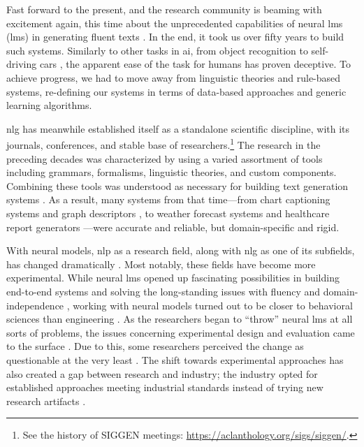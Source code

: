 Fast forward to the present, and the research community is beaming with excitement again, this time about the unprecedented capabilities of neural \aclp{lm} (\acsp{lm}) in generating fluent texts \cite{radford2019language,brown2020language}. In the end, it took us over fifty years to build such systems. Similarly to other tasks in \ac{ai}, from object recognition \cite{papert1966summer} to self-driving cars \cite{autonomouscars}, the apparent ease of the task for humans has proven deceptive.  To achieve progress, we had to move away from linguistic theories and rule-based systems, re-defining our systems in terms of data-based approaches and generic learning algorithms.

\Ac{nlg} has meanwhile established itself as a standalone scientific discipline, with its journals, conferences, and stable base of researchers.\footnote{See the history of SIGGEN meetings: \url{https://aclanthology.org/sigs/siggen/}.} The research in the preceding decades was characterized by using a varied assortment of tools including grammars, formalisms, linguistic theories, and custom components. Combining these tools was understood as necessary for building text generation systems \cite{mann-1982-text,reiterBuildingAppliedNatural1997}. As a result, many systems from that time---from chart captioning systems \cite{mittalDescribingComplexCharts1998} and graph descriptors \cite{sunDomainIndependentSentence2006}, to weather forecast systems \cite{belzAutomaticGenerationWeather2008} and healthcare report generators \cite{portetAutomaticGenerationTextual2009}---were accurate and reliable, but domain-specific and rigid.


With neural models, \ac{nlp} as a research field, along with \ac{nlg} as one of its subfields, has changed dramatically \cite{gururaja2023build,li2023defining}. Most notably, these fields have become more experimental. While neural \acp{lm} opened up fascinating possibilities in building end-to-end systems and solving the long-standing issues with fluency and domain-independence \cite{ferreiraNeuralDatatotextGeneration2019,dusekEvaluatingStateoftheartEndtoEnd2020,sharmaInnovationsNeuralDatatotext2022}, working with neural models turned out to be closer to behavioral sciences than engineering \cite{holtzmanGenerativeModelsComplex2023}. As the researchers began to ``throw'' neural \acp{lm} at all sorts of problems, the issues concerning experimental design and evaluation came to the surface \cite{gehrmannRepairingCrackedFoundation2022}. Due to this, some researchers perceived the change as questionable at the very least \cite{reiter2020academic,gururaja2023build,michael2023nlp}. The shift towards experimental approaches has also created a gap between research and industry; the industry opted for established approaches meeting industrial standards instead of trying new research artifacts \cite{daleNaturalLanguageGeneration2020,daleNavigatingTextGeneration2023}.


